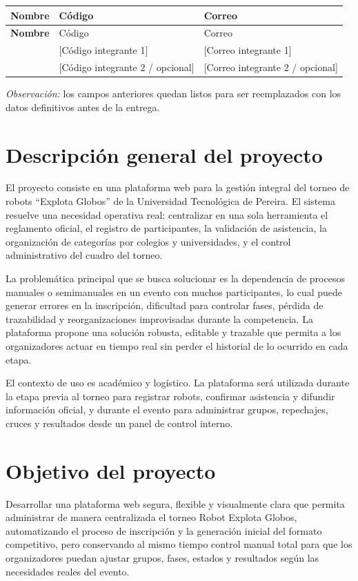 \documentclass[12pt,a4paper]{article}
\newcommand{\integranteUnoNombre}{[Nombre integrante 1]}
\newcommand{\integranteUnoCodigo}{[Código integrante 1]}
\newcommand{\integranteUnoCorreo}{[Correo integrante 1]}
\newcommand{\integranteDosNombre}{[Nombre integrante 2 / opcional]}
\newcommand{\integranteDosCodigo}{[Código integrante 2 / opcional]}
\newcommand{\integranteDosCorreo}{[Correo integrante 2 / opcional]}
\begin{document}
\begin{longtable}{>{\bfseries}p{4.2cm}p{3.5cm}p{6.2cm}}
\toprule
Nombre & Código & Correo \\
\midrule
\endfirsthead
\toprule
Nombre & Código & Correo \\
\midrule
\endhead
\integranteUnoNombre & \integranteUnoCodigo & \integranteUnoCorreo \\
\integranteDosNombre & \integranteDosCodigo & \integranteDosCorreo \\
\bottomrule
\end{longtable}

\textit{Observación:} los campos anteriores quedan listos para ser reemplazados con los datos definitivos antes de la entrega.

\section{Descripción general del proyecto}

El proyecto consiste en una plataforma web para la gestión integral del torneo de robots ``Explota Globos'' de la Universidad Tecnológica de Pereira. El sistema resuelve una necesidad operativa real: centralizar en una sola herramienta el reglamento oficial, el registro de participantes, la validación de asistencia, la organización de categorías por colegios y universidades, y el control administrativo del cuadro del torneo.

La problemática principal que se busca solucionar es la dependencia de procesos manuales o semimanuales en un evento con muchos participantes, lo cual puede generar errores en la inscripción, dificultad para controlar fases, pérdida de trazabilidad y reorganizaciones improvisadas durante la competencia. La plataforma propone una solución robusta, editable y trazable que permita a los organizadores actuar en tiempo real sin perder el historial de lo ocurrido en cada etapa.

El contexto de uso es académico y logístico. La plataforma será utilizada durante la etapa previa al torneo para registrar robots, confirmar asistencia y difundir información oficial, y durante el evento para administrar grupos, repechajes, cruces y resultados desde un panel de control interno.

\section{Objetivo del proyecto}

Desarrollar una plataforma web segura, flexible y visualmente clara que permita administrar de manera centralizada el torneo Robot Explota Globos, automatizando el proceso de inscripción y la generación inicial del formato competitivo, pero conservando al mismo tiempo control manual total para que los organizadores puedan ajustar grupos, fases, estados y resultados según las necesidades reales del evento.
\end{document}
